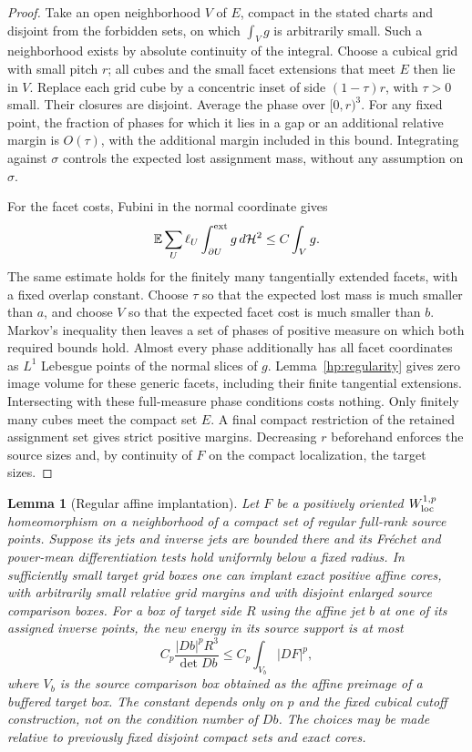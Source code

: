 \documentclass[11pt]{article}
\numberwithin{equation}{section}
\newtheorem{lemma}[theorem]{Lemma}
\theoremstyle{definition}
\theoremstyle{remark}
\newcommand{\cH}{\mathcal H}
\begin{document}
\begin{proof}
Take an open neighborhood $V$ of $E$, compact in the stated charts and
disjoint from the forbidden sets, on which $\int_Vg$ is arbitrarily
small.  Such a neighborhood exists by absolute continuity of the
integral.  Choose a cubical grid with small pitch $r$; all cubes and
the small facet extensions that meet $E$ then lie in $V$.  Replace
each grid cube by a concentric inset of side $(1-\tau)r$, with
$\tau>0$ small.  Their closures are disjoint.  Average the phase over
$[0,r)^3$.  For any fixed point, the fraction of phases for which it
lies in a gap or an additional relative margin is $O(\tau)$, with
the additional margin included in this bound.  Integrating against
$\sigma$ controls the expected lost assignment mass, without any
assumption on $\sigma$.

For the facet costs, Fubini in the normal coordinate gives
\[
 \mathbb E\sum_U\ell_U
       \int_{\partial U}^{\rm ext}g\,d\cH^2
       \leq C\int_Vg.
\]
The same estimate holds for the finitely many tangentially extended
facets, with a fixed overlap constant.  Choose $\tau$ so that the
expected lost mass is much smaller than $a$, and choose $V$ so that
the expected facet cost is much smaller than $b$.  Markov's
inequality then leaves a set of phases of positive measure on which
both required bounds hold.  Almost every phase additionally has all
facet coordinates as $L^1$ Lebesgue points of the normal slices of
$g$.  Lemma~\ref{hp:regularity} gives zero image volume for these
generic facets, including their finite tangential extensions.
Intersecting with these full-measure phase conditions costs nothing.
Only finitely many cubes meet the compact set $E$.  A final compact
restriction of the retained assignment set gives strict positive
margins.  Decreasing $r$ beforehand enforces the source sizes and,
by continuity of $F$ on the compact localization, the target sizes.
\end{proof}

\begin{lemma}[Regular affine implantation]\label{hp:regular-implant}
Let $F$ be a positively oriented $W^{1,p}_{\rm loc}$ homeomorphism
on a neighborhood of a compact set of regular full-rank source
points.  Suppose its jets and inverse jets are bounded there and its
Fr\'echet and power-mean differentiation tests hold uniformly below
a fixed radius.  In sufficiently small target grid boxes one can
implant exact positive affine cores, with arbitrarily small relative
grid margins and with disjoint enlarged source comparison boxes.
For a box of target side $R$ using the affine jet $b$ at one of its
assigned inverse points, the new energy in its source support is at
most
\begin{equation}\label{hp:regular-implant-cost}
 C_p\frac{|Db|^pR^3}{\det Db}
 \leq C_p\int_{V_b}|DF|^p,
\end{equation}
where $V_b$ is the source comparison box obtained as the affine
preimage of a buffered target box.  The constant depends only
on $p$ and the fixed cubical cutoff construction, not on the condition
number of $Db$.  The choices may be made relative to previously
fixed disjoint compact sets and exact cores.
\end{lemma}
\end{document}
